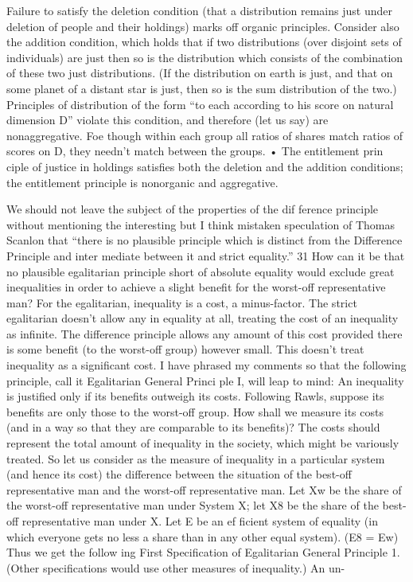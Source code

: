 \documentclass[11pt,openany]{book}
\begin{document}
Failure to satisfy the deletion condition (that a distribution remains just under deletion of people and their holdings) marks off organic principles. Consider also the addition condition, which holds that if two distributions (over disjoint sets of individuals) are just then so is the distribution which consists of the combination of these two just distributions. (If the distribution on earth is just, and that on some planet of a distant star is just, then so is the sum distribution of the two.) Principles of distribution of the form ``to each according to his score on natural dimension D'' violate this condition, and therefore (let us say) are nonaggregative. Foe though within each group all ratios of shares match ratios of scores on D, they needn't match between the groups. • The entitlement prin ciple of justice in holdings satisfies both the deletion and the addition conditions; the entitlement principle is nonorganic and aggregative. 

We should not leave the subject of the properties of the dif ference principle without mentioning the interesting but I think mistaken speculation of Thomas Scanlon that ``there is no plausible principle which is distinct from the Difference Principle and inter mediate between it and strict equality.'' 31 How can it be that no plausible egalitarian principle short of absolute equality would exclude great inequalities in order to achieve a slight benefit for the worst-off representative man? For the egalitarian, inequality is a cost, a minus-factor. The strict egalitarian doesn't allow any in equality at all, treating the cost of an inequality as infinite. The difference principle allows any amount of this cost provided there is some benefit (to the worst-off group) however small. This doesn't treat inequality as a significant cost. I have phrased my comments so that the following principle, call it Egalitarian General Princi ple I, will leap to mind: An inequality is justified only if its benefits outweigh its costs. Following Rawls, suppose its benefits are only those to the worst-off group. How shall we measure its costs (and in a way so that they are comparable to its benefits)? The costs should represent the total amount of inequality in the society, which might be variously treated. So let us consider as the measure of inequality in a particular system (and hence its cost) the difference between the situation of the best-off representative man and the worst-off representative man. Let Xw be the share of the worst-off representative man under System X; let X8 be the share of the best-off representative man under X. Let E be an ef ficient system of equality (in which everyone gets no less a share than in any other equal system). (E8 = Ew) Thus we get the follow ing First Specification of Egalitarian General Principle 1. (Other specifications would use other measures of inequality.) An un-
\end{document}
